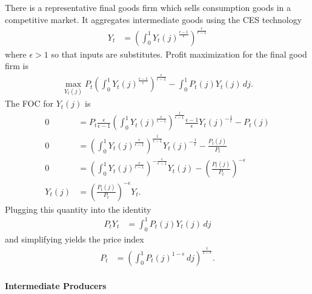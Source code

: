 \documentclass[12 pt, oneside]{article}
\theoremstyle{definition}
\theoremstyle{definition}
\theoremstyle{definition}
\begin{document}
There is a representative final goods firm which sells consumption goods in a competitive market.
It aggregates intermediate goods using the CES technology
\begin{align*}
  Y_t & = \left(\int_0^1 Y_t(j)^{ \frac{\epsilon - 1}{\epsilon}}\right)^{\frac{\epsilon}{\epsilon - 1}}
\end{align*}
where $\epsilon > 1$ so that inputs are substitutes. Profit maximization for the final good firm is
\begin{align*}
  \max_{Y_t(j)} P_t\left(\int_0^1 Y_t(j)^{ \frac{\epsilon - 1}{\epsilon}}\right)^{\frac{\epsilon}{\epsilon - 1}} - \int_0^1 P_t(j) Y_t(j)\, dj.
\end{align*}
The FOC for $Y_t(j)$ is
\begin{align*}
  0 & = P_t\frac{\epsilon}{\epsilon - 1}\left(\int_0^1 Y_t(j)^{\frac{\epsilon}{\epsilon - 1}}\right)^{\frac{1}{\epsilon - 1}}\frac{\epsilon - 1}{\epsilon} Y_t(j)^{-\frac{1}{\epsilon}} - P_t(j)\\
  0 & = \left(\int_0^1 Y_t(j)^{\frac{\epsilon}{\epsilon - 1}}\right)^{\frac{1}{\epsilon - 1}}Y_t(j)^{-\frac{1}{\epsilon}} - \frac{P_t(j)}{P_t}\\
  0 & = \left(\int_0^1 Y_t(j)^{\frac{\epsilon}{\epsilon - 1}}\right)^{-\frac{\epsilon}{\epsilon - 1}}Y_t(j) - \left(\frac{P_t(j)}{P_t}\right)^{-\epsilon}\\
  Y_t(j) & =  \left(\frac{P_t(j)}{P_t}\right)^{-\epsilon} Y_t.
\end{align*}
Plugging this quantity into the identity
\begin{align*}
  P_tY_t & = \int_0^1 P_t(j) Y_t(j)\, dj
\end{align*}
and simplifying yields the price index
\begin{align*}
  P_t & = \left(\int_0^1 P_t(j)^{1 - \epsilon}\, dj\right)^{\frac{1}{1 - \epsilon}}.
\end{align*}

\paragraph{Intermediate Producers}
\end{document}
